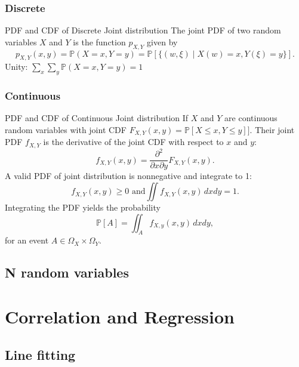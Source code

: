 \documentclass[11pt,a4paper,fleqn]{article}
\numberwithin{equation}{section}
\newcommand{\prob}{\mathbb{P}}
\newcommand{\samplespace}{\Omega}
\begin{document}
\subsubsection{Discrete}

\begin{fact}{PDF and CDF of Discrete Joint distribution}{}
    The joint PDF of two random variables $X$ and $Y$ is the function $p_{X,Y}$ given by
    \begin{equation*}
        p_{X,Y}(x,y) = \prob(X=x,Y=y) = \prob[\{ (w,\xi) \mid X(w) =x, Y(\xi) = y\}].
    \end{equation*}
    Unity: $ \sum_x \sum_y \prob(X=x,Y=y) = 1$
\end{fact}

\subsubsection{Continuous}

\begin{fact}{PDF and CDF of Continuous Joint distribution}{}
    If $X$ and $Y$ are continuous random variables with joint CDF $F_{X,Y}(x,y)=\prob[X\le x,Y\le y]]$.
    Their joint PDF $f_{X,Y}$ is the derivative of the joint CDF with respect to $x$ and $y$:
    \begin{equation*}
        f_{X,Y}(x,y)=\frac{\partial^2}{\partial{x}\partial{y}}F_{X,Y}(x,y).
    \end{equation*}
    A valid PDF of joint distribution is nonnegative and integrate to 1:
    \begin{equation*}
        f_{X,Y}(x,y) \ge 0 \text{ and} \iint f_{X,Y}(x,y)\,dxdy=1.
    \end{equation*}
    Integrating the PDF yields the probability 
    \begin{equation*}
        \prob[A]=\iint_{A}f_{X,y}(x,y)\,dxdy ,
    \end{equation*}
    for an event $A\in\samplespace_X\times\samplespace_Y$.
\end{fact}

\subsection{N random variables}


\section{Correlation and Regression}

\subsection{Line fitting}
\end{document}

